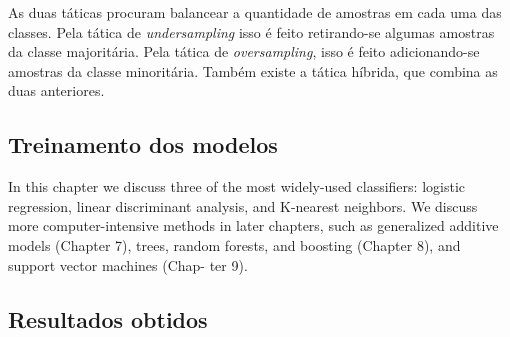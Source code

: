 
			As duas táticas procuram balancear a quantidade de amostras em cada uma das classes. Pela tática de \emph{undersampling} isso é feito retirando-se algumas amostras da classe majoritária. Pela tática de \emph{oversampling}, isso é feito adicionando-se amostras da classe minoritária. Também existe a tática híbrida, que combina as duas anteriores.








		\subsection{Treinamento dos modelos}

		In this chapter we discuss three of the most
widely-used classifiers: logistic regression, linear discriminant analysis, and
K-nearest neighbors. We discuss more computer-intensive methods in later
chapters, such as generalized additive models (Chapter 7), trees, random
forests, and boosting (Chapter 8), and support vector machines (Chap-
ter 9).



		\subsection{Resultados obtidos}

